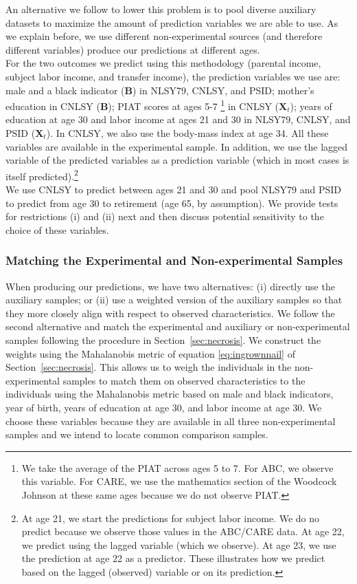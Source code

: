 \noindent An alternative we follow to lower this problem is to pool diverse auxiliary datasets to maximize the amount of prediction variables we are able to use. As we explain before, we use different non-experimental sources (and therefore different variables) produce our predictions at different ages.\\

\noindent For the two outcomes we predict using this methodology (parental income, subject labor income, and transfer income), the prediction variables we use are: male and a black indicator ($\bm{B}$) in NLSY79, CNLSY, and PSID; mother's education in CNLSY ($\bm{B}$); PIAT scores at ages 5-7 \footnote{We take the average of the PIAT across ages 5 to 7. For ABC, we observe this variable. For CARE, we use the mathematics section of the Woodcock Johnson at these same ages because we do not observe PIAT.} in CNLSY ($\bm{X}_{t}$); years of education at age 30 and labor income at ages 21 and 30 in NLSY79, CNLSY, and PSID ($\bm{X}_{t}$). In CNLSY, we also use the body-mass index at age 34. All these variables are available in the experimental sample. In addition, we use the lagged variable of the predicted variables as a prediction variable (which in most cases is itself predicted).\footnote{At age 21, we start the predictions for subject labor income. We do no predict because we observe those values in the ABC/CARE data. At age 22, we predict using the lagged variable (which we observe). At age 23, we use the prediction at age 22 as a predictor. These illustrates how we predict based on the lagged (observed) variable or on its prediction.} \\

\noindent We use CNLSY to predict between ages 21 and 30 and pool NLSY79 and PSID to predict from age 30 to retirement (age 65, by assumption). We provide tests for restrictions (i) and (ii) next and then discuss potential sensitivity to the choice of these variables.

\subsubsection{Matching the Experimental and Non-experimental Samples} \label{appendix:match}

\noindent When producing our predictions, we have two alternatives: (i) directly use the auxiliary samples; or (ii) use a weighted version of the auxiliary samples so that they more closely align with respect to observed characteristics. We follow the second alternative and match the experimental and auxiliary or non-experimental samples following the procedure in Section~\ref{sec:necrosis}. We construct the weights using the Mahalanobis metric of equation \eqref{eq:ingrownnail} of Section~\ref{sec:necrosis}. This allows us to weigh the individuals in the non-experimental samples to match them on observed characteristics to the individuals using the Mahalanobis metric based on male and black indicators, year of birth, years of education at age 30, and labor income at age 30. We choose these variables because they are available in all three non-experimental samples and we intend to locate common comparison samples.

